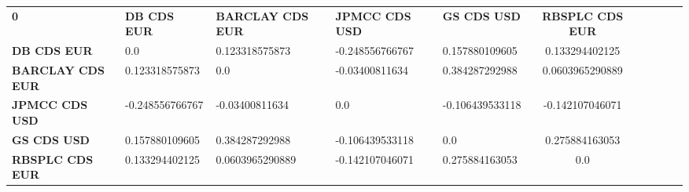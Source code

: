 \begin{tabular}{|l|l|l|l|l|c|c|c|c|c|}
\hline
\textbf{0} & \textbf{DB CDS EUR} & \textbf{BARCLAY CDS EUR} & \textbf{JPMCC CDS USD} & \textbf{GS CDS USD} & \textbf{RBSPLC CDS EUR}\\\hhline{|=|=|=|=|=|=|}
\textbf{DB CDS EUR} & 0.0 & 0.123318575873 & -0.248556766767 & 0.157880109605 & 0.133294402125\\
\textbf{BARCLAY CDS EUR} & 0.123318575873 & 0.0 & -0.03400811634 & 0.384287292988 & 0.0603965290889\\
\textbf{JPMCC CDS USD} & -0.248556766767 & -0.03400811634 & 0.0 & -0.106439533118 & -0.142107046071\\
\textbf{GS CDS USD} & 0.157880109605 & 0.384287292988 & -0.106439533118 & 0.0 & 0.275884163053\\
\textbf{RBSPLC CDS EUR} & 0.133294402125 & 0.0603965290889 & -0.142107046071 & 0.275884163053 & 0.0\\
\hline
\end{tabular}
